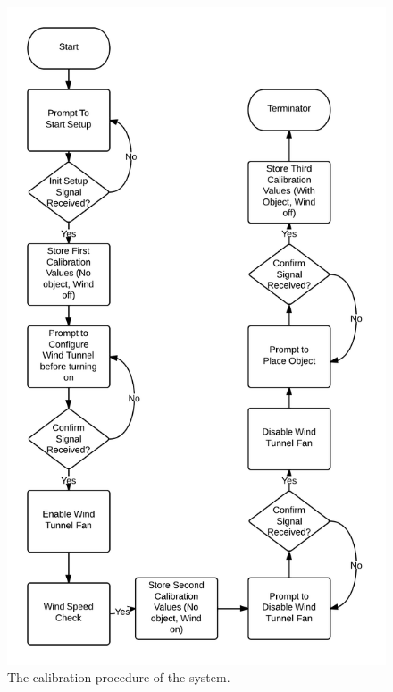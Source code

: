 	\begin{figure}[H]
		\centering
			\includegraphics[scale=0.25]{img/flowchart-calibration}
		\caption{The calibration procedure of the system.}
	\end{figure}

